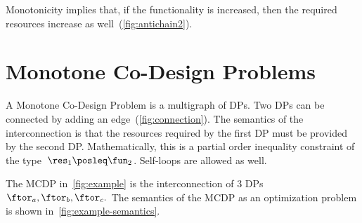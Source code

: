\noindent Monotonicity implies that, if the functionality is increased,
then the required resources increase as well~(\cref{fig:antichain2}).



\section{Monotone Co-Design Problems \label{sec:Monotone-Co-Design-Problems}}

A Monotone Co-Design Problem is a multigraph of DPs. Two DPs can be
connected by adding an edge~(\cref{fig:connection}). The semantics
of the interconnection is that the resources required by the first
DP must be provided by the second DP. Mathematically, this is a partial
order inequality constraint of the type~$\res_{1}\posleq\fun_{2}$.
Self-loops are allowed as well.

\begin{example}
    The MCDP in~\cref{fig:example} is the interconnection of 3
    DPs $\ftor_{a},\ftor_{b},\ftor_{c}.$ The semantics of the MCDP as
    an optimization problem is shown in~\cref{fig:example-semantics}.

\end{example}

\\

